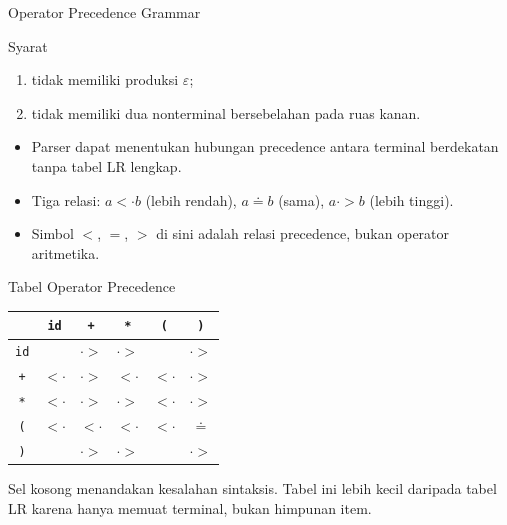 \documentclass[aspectratio=169,10pt,t]{beamer}
\begin{document}
\begin{frame}{Operator Precedence Grammar}
  \begin{block}{Syarat}
    \small
    \begin{enumerate}
      \item tidak memiliki produksi \(\varepsilon\);
      \item tidak memiliki dua nonterminal bersebelahan pada ruas
            kanan.
    \end{enumerate}
  \end{block}

  \begin{itemize}
    \item Parser dapat menentukan hubungan precedence antara terminal
          berdekatan tanpa tabel LR lengkap.
    \item Tiga relasi: \(a <\cdot b\) (lebih rendah),
          \(a \doteq b\) (sama), \(a \cdot> b\) (lebih tinggi).
    \item Simbol \(<\), \(=\), \(>\) di sini adalah relasi precedence,
          bukan operator aritmetika.
  \end{itemize}
\end{frame}

\begin{frame}{Tabel Operator Precedence}
  \scriptsize
  \setlength{\tabcolsep}{5pt}
  \begin{tabular}{@{}c c c c c c@{}}
    \toprule
     & \texttt{id} & \texttt{+} & \texttt{*} & \texttt{(} &
       \texttt{)} \\
    \midrule
    \texttt{id} & & \(\cdot>\) & \(\cdot>\) & & \(\cdot>\) \\
    \texttt{+} & \(<\cdot\) & \(\cdot>\) & \(<\cdot\) & \(<\cdot\) &
      \(\cdot>\) \\
    \texttt{*} & \(<\cdot\) & \(\cdot>\) & \(\cdot>\) & \(<\cdot\) &
      \(\cdot>\) \\
    \texttt{(} & \(<\cdot\) & \(<\cdot\) & \(<\cdot\) & \(<\cdot\) &
      \(\doteq\) \\
    \texttt{)} & & \(\cdot>\) & \(\cdot>\) & & \(\cdot>\) \\
    \bottomrule
  \end{tabular}

  \vspace{5pt}
  {\scriptsize\color{ubbblue!75}Sel kosong menandakan kesalahan
  sintaksis. Tabel ini lebih kecil daripada tabel LR karena hanya
  memuat terminal, bukan himpunan item.}
\end{frame}
\end{document}

